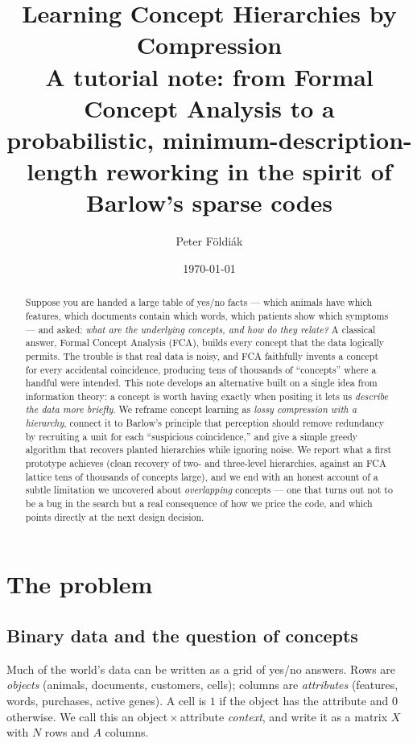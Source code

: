\documentclass[11pt]{article}
\title{\bf Learning Concept Hierarchies by Compression\\[2pt]
\large A tutorial note: from Formal Concept Analysis to a probabilistic,
minimum-description-length reworking in the spirit of Barlow's sparse codes}
\author{Peter F\"oldi\'ak}
\date{\today}
\begin{document}
\maketitle

\begin{abstract}
\noindent
Suppose you are handed a large table of yes/no facts --- which animals have
which features, which documents contain which words, which patients show which
symptoms --- and asked: \emph{what are the underlying concepts, and how do they
relate?} A classical answer, Formal Concept Analysis (FCA), builds every
concept that the data logically permits. The trouble is that real data is
noisy, and FCA faithfully invents a concept for every accidental coincidence,
producing tens of thousands of ``concepts'' where a handful were intended. This
note develops an alternative built on a single idea from information theory: a
concept is worth having exactly when positing it lets us \emph{describe the data
more briefly}. We reframe concept learning as \emph{lossy compression with a
hierarchy}, connect it to Barlow's principle that perception should remove
redundancy by recruiting a unit for each ``suspicious coincidence,'' and give a
simple greedy algorithm that recovers planted hierarchies while ignoring noise.
We report what a first prototype achieves (clean recovery of two- and
three-level hierarchies, against an FCA lattice tens of thousands of concepts
large), and we end with an honest account of a subtle limitation we uncovered
about \emph{overlapping} concepts --- one that turns out not to be a bug in the
search but a real consequence of how we price the code, and which points
directly at the next design decision.
\end{abstract}

\tableofcontents

\section{The problem}

\subsection{Binary data and the question of concepts}

Much of the world's data can be written as a grid of yes/no answers. Rows are
\emph{objects} (animals, documents, customers, cells); columns are
\emph{attributes} (features, words, purchases, active genes). A cell is $1$ if
the object has the attribute and $0$ otherwise. We call this an
object\,$\times$\,attribute \emph{context}, and write it as a matrix $X$ with
$N$ rows and $A$ columns.
\end{document}
